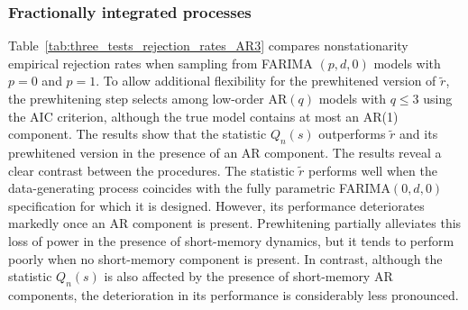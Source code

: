 \documentclass[12pt]{article}
\numberwithin{equation}{section}
\begin{document}
\subsubsection{Fractionally integrated processes}
Table~\ref{tab:three_tests_rejection_rates_AR3} compares nonstationarity empirical rejection rates when sampling from FARIMA $(p,d,0)$ models with $p=0$ and $p=1$. To allow additional flexibility for the prewhitened version of $\tilde r$, the prewhitening step selects among low-order AR$(q)$ models with $q\le3$ using the AIC criterion, although the true model contains at most an AR(1) component. The results show that the statistic $Q_n(s)$ outperforms $\tilde r$ and its prewhitened version in the presence of an AR component. The results reveal a clear contrast between the procedures. The statistic $\tilde r$ performs well when the data-generating process coincides with the fully parametric FARIMA$(0,d,0)$ specification for which it is designed. However, its performance deteriorates markedly once an AR component is present. Prewhitening partially alleviates this loss of power in the presence of short-memory dynamics, but it tends to perform poorly when no short-memory component is present. In contrast, although the statistic $Q_n(s)$ is also affected by the presence of short-memory AR components, the deterioration in its performance is considerably less pronounced.
\end{document}
